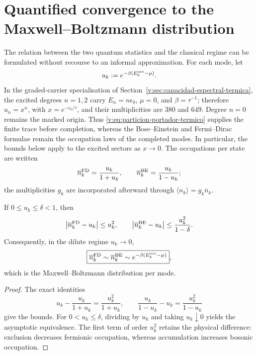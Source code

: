 \par\endgroup
\section{Quantified convergence to the Maxwell--Boltzmann distribution}
\label{v:rec:ocupacion:section:03}

The relation between the two quantum statistics and the classical regime can
be formulated without recourse to an informal approximation. For each mode, let
\[
 u_k:=e^{-\beta(E_k^{\rm occ}-\mu)}.
\]
In the graded-carrier specialisation of
Section~\ref{v:sec:capacidad-espectral-termica}, the excited degrees
$n=1,2$ carry $E_n=n\epsilon_0$, $\mu=0$, and
$\beta=\tau^{-1}$; therefore $u_n=x^n$, with
$x=e^{-\epsilon_0/\tau}$, and their multiplicities are $380$ and $649$.
Degree $n=0$ remains the marked origin. Thus
\eqref{v:eq:particion-portador-termico} supplies the finite trace before
completion, whereas the Bose--Einstein and Fermi--Dirac formulae remain
the occupation laws of the completed modes. In particular, the bounds
below apply to the excited sectors as $x\to0$.
The occupations per state are written
\[
 \overline n_k^{\rm FD}=\frac{u_k}{1+u_k},
 \qquad
 \overline n_k^{\rm BE}=\frac{u_k}{1-u_k};
\]
the multiplicities \(g_k\) are incorporated afterward through
\(\langle n_k\rangle=g_k\overline n_k\).

\begin{theorem}
\label{v:rec:thm:limite-clasico-fd-be-rev2}
If \(0\leq u_k\leq\delta<1\), then
\[
 \left|\overline n_k^{\rm FD}-u_k\right|\leq u_k^2,
 \qquad
 \left|\overline n_k^{\rm BE}-u_k\right|
 \leq\frac{u_k^2}{1-\delta}.
\]
Consequently, in the dilute regime \(u_k\to0\),
\[
 \boxed{
 \overline n_k^{\rm FD}\sim
 \overline n_k^{\rm BE}\sim
 e^{-\beta(E_k^{\rm occ}-\mu)}} ,
\]
which is the Maxwell--Boltzmann distribution per mode.
\end{theorem}

\begin{proof}
The exact identities
\[
 u_k-\frac{u_k}{1+u_k}=\frac{u_k^2}{1+u_k},
 \qquad
 \frac{u_k}{1-u_k}-u_k=\frac{u_k^2}{1-u_k}
\]
give the bounds. For \(0<u_k\leq\delta\), dividing by \(u_k\) and
taking \(u_k\downarrow0\) yields
the asymptotic equivalence. The first term of order \(u_k^2\) retains the
physical difference: exclusion decreases fermionic occupation, whereas
accumulation increases bosonic occupation.
\end{proof}
